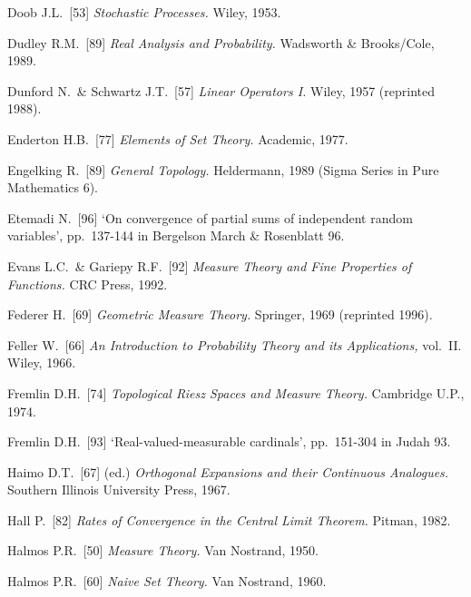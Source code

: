 {Doob J.L.\ [53] {\it Stochastic Processes.}  Wiley, 1953.

Dudley R.M.\ [89] {\it Real Analysis and Probability.} Wadsworth \&
Brooks/Cole, 1989.   \cmmnt{[\S282 {\it catatan}.]}

Dunford N.\ \& Schwartz J.T.\ [57] {\it Linear Operators I.}  Wiley,
1957 (reprinted 1988).  \cmmnt{[\S244 {\it catatan}, 2A5J.]}

\medskip%

Enderton H.B.\ [77] {\it Elements of Set Theory.}   Academic, 1977.
\cmmnt{[\S2A1.]}

Engelking R.\ [89] {\it General Topology.} Heldermann, 1989 (Sigma
Series in Pure Mathematics 6).   \cmmnt{[2A5F.]}

Etemadi N.\ [96] `On convergence of partial sums of independent random
variables', pp.\ 137-144 in {\smc Bergelson March \& Rosenblatt 96}.
\cmmnt{[272V.]}

Evans L.C.\ \& Gariepy R.F.\ [92] {\it Measure Theory and Fine
Properties of Functions.}   CRC Press, 1992.
\cmmnt{[263Ec, \S265 {\it catatan}.]}

\medskip%

Federer H.\ [69] {\it Geometric Measure Theory.}  Springer, 1969
(reprinted 1996).

Feller W.\ [66] {\it An Introduction to Probability Theory and its
Applications,} vol.\ II.   Wiley, 1966.  

Fremlin D.H.\ [74] {\it Topological Riesz Spaces and
Measure Theory.}   Cambridge U.P., 1974.

Fremlin D.H.\ [93] `Real-valued-measurable cardinals', pp.\ 151-304 in
{\smc Judah 93}.  \cmmnt{[232H.]}

\medskip%

Haimo D.T.\ [67] (ed.) {\it Orthogonal Expansions and their Continuous
Analogues.}   Southern Illinois University Press, 1967.

Hall P.\ [82] {\it Rates of Convergence in the Central Limit Theorem.}
Pitman, 1982.  \cmmnt{[274H.]}

Halmos P.R.\ [50] {\it Measure Theory.}  Van Nostrand, 1950.

Halmos P.R.\ [60] {\it Naive Set Theory.} Van Nostrand, 1960.
\cmmnt{[\S2A1.]}

}
